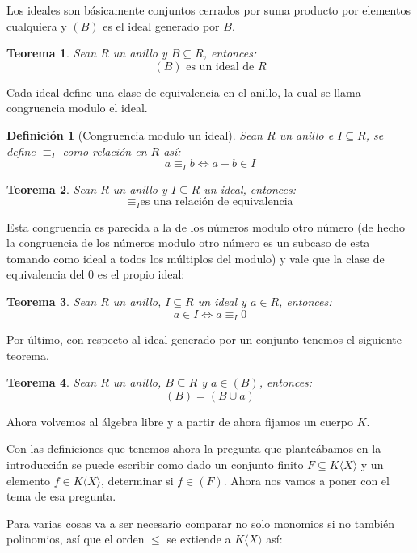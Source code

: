\documentclass[12pt]{report}
\theoremstyle{customstyle}
\newtheorem{definition}{Definición}[chapter]
\newtheorem{theorem}{Teorema}[chapter]
\theoremstyle{factstyle}
\begin{document}
Los ideales son básicamente conjuntos cerrados por suma producto por elementos cualquiera y $(B)$ es el ideal generado por $B$.

\begin{theorem}
  Sean $R$ un anillo y $B ⊆ R$, entonces:
  \[ (B)\text{ es un ideal de }R \]
\end{theorem}

Cada ideal define una clase de equivalencia en el anillo, la cual se llama congruencia modulo el ideal.

\begin{definition}[Congruencia modulo un ideal]\label{def:congruencia mod ideal}
  Sean $R$ un anillo e $I ⊆ R$, se define $≡_I$ como relación en $R$ así:
  \[ a ≡_I b ⇔ a - b ∈ I \]
\end{definition}

\begin{theorem}\label{thm:congruencia mod ideal es equivalencia}
  Sean $R$ un anillo y $I ⊆ R$ un ideal, entonces:
  \[ ≡_I \text{es una relación de equivalencia} \]
\end{theorem}

Esta congruencia es parecida a la de los números modulo otro número (de hecho la congruencia de los números modulo otro número es un subcaso de esta tomando como ideal a todos los múltiplos del modulo) y vale que la clase de equivalencia del $0$ es el propio ideal:

\begin{theorem}\label{thm:en ideal ⇔ congruente 0}
Sean $R$ un anillo, $I ⊆ R$ un ideal y $a ∈ R$, entonces:
\[ a ∈ I ⇔ a ≡_I 0 \]
\end{theorem}

Por último, con respecto al ideal generado por un conjunto tenemos el siguiente teorema.

\begin{theorem}\label{thm:gen B = gen B U a con a ∈ gen B}
  Sean $R$ un anillo, $B ⊆ R$ y $a ∈ (B)$, entonces:
  \[ (B) = (B ∪ {a}) \]
\end{theorem}

Ahora volvemos al álgebra libre y a partir de ahora fijamos un cuerpo $K$.

Con las definiciones que tenemos ahora la pregunta que planteábamos en la introducción se puede escribir como dado un conjunto finito $F ⊆ K⟨X⟩$ y un elemento $f ∈ K⟨X⟩$, determinar si $f ∈ (F)$. Ahora nos vamos a poner con el tema de esa pregunta.

Para varias cosas va a ser necesario comparar no solo monomios si no también polinomios, así que el orden $≤$ se extiende a $K⟨X⟩$ así:
\end{document}
